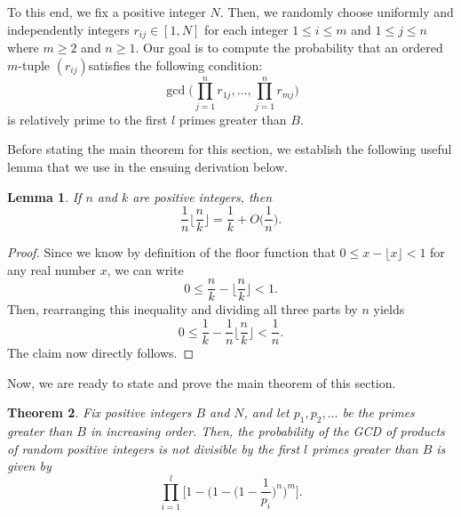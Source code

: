 \documentclass[10pt,a4paper]{article}
\newtheorem{theorem}{Theorem}[section]
\newtheorem{lemma}[theorem]{Lemma}
\theoremstyle{definition}
\theoremstyle{remark}
\begin{document}
\vspace{.1 in}

To this end, we fix a positive integer $N$. Then, we randomly choose uniformly and independently integers $r_{ij} \in [1, N]$ for each integer $1 \leq i \leq m$ and $1 \leq j \leq n$ where $m \geq 2$ and $n \geq 1$. Our goal is to compute the probability that an ordered $m$-tuple $(r_{ij})$satisfies the following condition:
$$\gcd\Big(\prod_{j=1}^nr_{1j}, ..., \prod_{j=1}^n r_{mj}\Big)$$
is relatively prime to the first $l$ primes greater than $B$. 

Before stating the main theorem for this section, we establish the following useful lemma that we use in the ensuing derivation below.

\begin{lemma} If $n$ and $k$ are positive integers, then
$$\frac{1}{n} \Big\lfloor \frac{n}{k} \Big\rfloor = \frac{1}{k} + O\Big(\frac{1}{n}\Big).$$
\end{lemma}

\begin{proof}
Since we know by definition of the floor function that $0 \leq x - \lfloor x \rfloor < 1$ for any real number $x$, we can write
$$0 \leq \frac{n}{k} - \Big\lfloor \frac{n}{k} \Big\rfloor < 1.$$
Then, rearranging this inequality and dividing all three parts by $n$ yields
$$0 \leq \frac{1}{k} - \frac{1}{n}\Big\lfloor \frac{n}{k}\Big\rfloor < \frac{1}{n}.$$
The claim now directly follows.
\end{proof}

Now, we are ready to state and prove the main theorem of this section.

\begin{theorem}
Fix positive integers $B$ and $N$, and let $p_1, p_2, ...$ be the primes greater than $B$ in increasing order. Then, the probability of the GCD of products of random positive integers is not divisible by the first $l$ primes greater than $B$ is given by \label{probability-random-first-l}
$$\prod_{i=1}^{l} \Big[1 - \Big(1 - \Big(1-\frac{1}{p_i}\Big)^n\Big)^m\Big].$$
\end{theorem}
\end{document}
